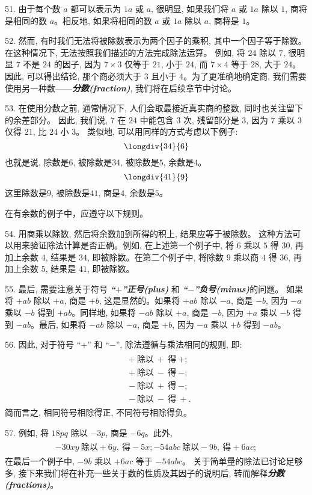 51. 由于每个数 $a$ 都可以表示为 $1a$ 或 $a$, 很明显, 如果我们将 $a$ 或 $1a$ 除以 $1$, 
商将是相同的数 $a$。相反地, 如果将相同的数 $a$ 或 $1a$ 除以 $a$, 商将是 $1$。

52. 然而, 有时我们无法将被除数表示为两个因子的乘积, 其中一个因子等于除数。在这种情况下, 无法按照我们描述的方法完成除法运算。
例如, 将 $24$ 除以 $7$, 很明显 $7$ 不是 $24$ 的因子, 因为 $7\times3$ 仅等于 $21$, 
小于 $24$, 而 $7\times4$ 等于 $28$, 大于 $24$。
因此, 可以得出结论, 那个商必须大于 $3$ 且小于 $4$。为了更准确地确定商, 
我们需要使用另一种数——\textbf{\textit{分数(fraction)}}, 我们将在后续章节中讨论。

53. 在使用分数之前, 通常情况下, 人们会取最接近真实商的整数, 同时也关注留下的余差部分。
因此, 我们说, $7$ 在 $24$ 中能包含 $3$ 次, 残留部分是 $3$, 因为 $7$ 乘以 $3$ 仅得 $21$, 比 $24$ 小 $3$。  
类似地, 可以用同样的方式考虑以下例子:   
\[
\longdiv{34}{6}
\]
也就是说, 除数是$6$, 被除数是$34$, 被除数是$5$, 余数是$4$。
\[
\longdiv{41}{9}
\]
这里除数是$9$, 被除数是$41$, 商是$4$, 余数是$5$。
\par
在有余数的例子中，应遵守以下规则。

54. 用商乘以除数, 然后将余数加到所得的积上, 结果应等于被除数。
这种方法可以用来验证除法计算是否正确。例如, 在上述第一个例子中, 
将 $6$ 乘以 $5$ 得 $30$, 再加上余数 $4$, 结果是 $34$, 即被除数。在第二个例子中, 
将除数 $9$ 乘以商 $4$ 得 $36$, 再加上余数 $5$, 结果是 $41$, 即被除数。

55. 最后, 需要注意关于符号 \textbf{\textit{“$+$”正号(plus)}} 和 \textbf{\textit{“$-$”负号(minus)}}的问题。
如果将 $+ab$ 除以 $+a$, 商是 $+b$, 这是显然的。如果将 $+ab$ 除以 $-a$, 商是 $-b$, 因为 $-a$ 乘以 $-b$ 得到 $+ab$。同样地, 
如果将 $-ab$ 除以 $+a$, 商是 $-b$, 因为 $+a$ 乘以 $-b$ 得到 $-ab$。最后, 如果将 $-ab$ 除以 $-a$, 商是 $+b$, 因为 $-a$ 乘以 $+b$ 得到 $-ab$。

56. 因此, 对于符号 “$+$” 和 “$-$”, 除法遵循与乘法相同的规则, 即: 
\begin{gather*}
\begin{aligned}
&+ \ \text{除以}\  + \ \text{得}\  +; \\  
&+ \ \text{除以}\  - \ \text{得}\  -; \\
&- \ \text{除以}\  + \ \text{得}\  -; \\
&- \ \text{除以}\  - \ \text{得}\  +.
\end{aligned}
\end{gather*}
简而言之, 相同符号相除得正, 不同符号相除得负。

57. 例如, 将 $18pq$ 除以 $-3p$, 商是 $-6q$。此外,   
\begin{gather*}
\begin{aligned}
 -30xy \ \text{除以} +6y, \ \text{得} -5x;   
 -54abc \ \text{除以} -9b, \ \text{得} +6ac;   
\end{aligned}
\end{gather*}
在最后一个例子中, $-9b$ 乘以 $+6ac$ 等于 $-54abc$。  
关于简单量的除法已讨论足够多, 接下来我们将在补充一些关于数的性质及其因子的说明后, 转而解释\textbf{\textit{分数(fractions)}}。
